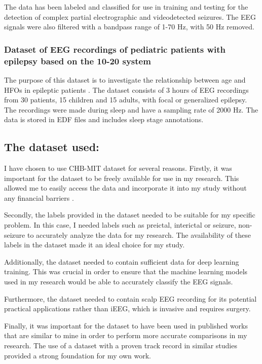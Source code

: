 The data has been labeled and classified for use in training and testing for the detection of complex partial electrographic and videodetected seizures. The \gls{EEG} signals were also filtered with a bandpass range of 1-70 Hz, with 50 Hz removed.


\subsubsection{Dataset of EEG recordings of pediatric patients with epilepsy based on the 10-20 system}
The purpose of this dataset is to investigate the relationship between age and \glspl{HFO} in epileptic patients \cite{cserpan_dataset_2021}. The dataset consists of 3 hours of \gls{EEG} recordings from 30 patients, 15 children and 15 adults, with focal or generalized epilepsy. The recordings were made during sleep and have a sampling rate of 2000 Hz. The data is stored in \gls{EDF} files and includes sleep stage annotations.

\subsection{The dataset used: } \label{subsec:dataset-used}
I have chosen to use \gls{CHB-MIT} dataset for several reasons. Firstly, it was important for the dataset to be freely available for use in my research. This allowed me to easily access the data and incorporate it into my study without any financial barriers \cite{shoeb_application_2009, shoeb_chb-mit_2010}.

Secondly, the labels provided in the dataset needed to be suitable for my specific problem. In this case, I needed labels such as preictal, interictal or seizure, non-seizure to accurately analyze the data for my research. The availability of these labels in the dataset made it an ideal choice for my study.

Additionally, the dataset needed to contain sufficient data for deep learning training. This was crucial in order to ensure that the machine learning models used in my research would be able to accurately classify the \gls{EEG} signals.

Furthermore, the dataset needed to contain scalp \gls{EEG} recording for its potential practical applications rather than \gls{iEEG}, which is invasive and requires surgery.

Finally, it was important for the dataset to have been used in published works that are similar to mine in order to perform more accurate comparisons in my research. The use of a dataset with a proven track record in similar studies provided a strong foundation for my own work.

